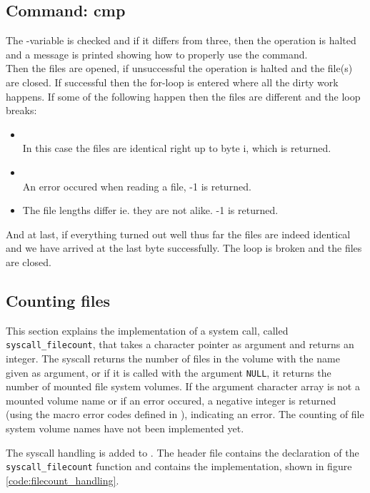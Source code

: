 \subsection{Command: cmp}
The -variable is checked and if it differs from three, then the
operation is halted and a message is printed showing how to properly use the
command.\\
Then the files are opened, if unsuccessful the operation is halted and the
file(s) are closed. If successful then the for-loop is entered where all the
dirty work happens. If some of the following happen then the files are different
and the loop breaks:\\
\begin{itemize}
  \item {}\\
        In this case the files are identical right up to byte i, which is
        returned.
  \item {}\\
        An error occured when reading a file, -1 is returned.
  \item {}
        The file lengths differ ie. they are not alike. -1 is returned.
\end{itemize}
And at last, if everything turned out well thus far the files are indeed
identical and we have arrived at the last byte successfully. The loop is broken
and the files are closed.


\subsection{Counting files}
This section explains the implementation of a system call, called
\verb|syscall_filecount|, that takes a character pointer as argument and
returns an integer. The syscall returns the number of files in the volume with
the name given as argument, or if it is called with the argument \verb|NULL|,
it returns the number of mounted file system volumes. If the argument character
array is not a mounted volume name or if an error occured, a negative integer
is returned (using the macro error codes defined in ), indicating
an error. The counting of file system volume names have not been implemented
yet.

The syscall handling is added to . The header file
contains the declaration of the \verb|syscall_filecount| function and
 contains the implementation, shown in figure
\ref{code:filecount_handling}.

